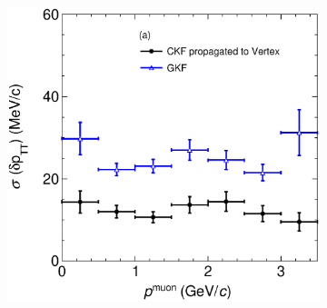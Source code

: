 \begin{figure}[t]
\begin{subfigure}[b]{0.32\textwidth}
         \caption{}
        \label{fig:deltapTTVSlArmMC13.eps}
     \end{subfigure}
     \begin{subfigure}[b]{0.32\textwidth}
         \centering
         \includegraphics[width=\textwidth]{figures/ch6-TKI/2D/deltapTTVSp13.eps}
         \caption{}
         \label{fig:deltapTTVSp13.eps}
     \end{subfigure}
     

\end{figure}
